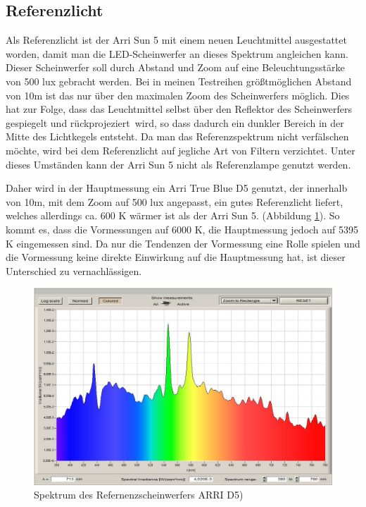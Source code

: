 \subsection{Referenzlicht}
\label{sec_reflicht}
Als Referenzlicht ist der Arri Sun 5 mit einem neuen Leuchtmittel ausgestattet worden, damit man die LED-Scheinwerfer an dieses Spektrum angleichen kann. Dieser Scheinwerfer soll durch Abstand und Zoom auf eine Beleuchtungsstärke von 500 lux gebracht werden. Bei in meinen Testreihen größtmöglichen Abstand von 10m ist das nur über den maximalen Zoom des Scheinwerfers möglich. Dies hat zur Folge, dass das Leuchtmittel selbst über den Reflektor des Scheinwerfers gespiegelt und \glqq rückprojeziert\grqq\ wird, so dass dadurch ein dunkler Bereich in der Mitte des Lichtkegels entsteht. Da man das Referenzspektrum nicht verfälschen möchte, wird bei dem Referenzlicht auf jegliche Art von Filtern verzichtet. Unter dieses Umständen kann der Arri Sun 5 nicht als Referenzlampe genutzt werden.

Daher wird in der Hauptmessung ein Arri True Blue D5 genutzt, der innerhalb von 10m, mit dem Zoom auf 500 lux angepasst, ein gutes Referenzlicht liefert, welches allerdings ca. 600 K wärmer ist als der Arri Sun 5. (Abbildung \ref{b_ref}). So kommt es, dass die Vormessungen auf 6000 K, die Hauptmessung jedoch auf 5395 K eingemessen sind. Da nur die Tendenzen der Vormessung eine Rolle spielen und die Vormessung keine direkte Einwirkung auf die Hauptmessung hat, ist dieser Unterschied zu vernachlässigen.

\begin{figure}[H]     %
\centering
\includegraphics[width=1.0\textwidth]{bilder/ref} 
\caption {Spektrum des Refernenzscheinwerfers ARRI D5)}\label{b_ref}
\end{figure}

